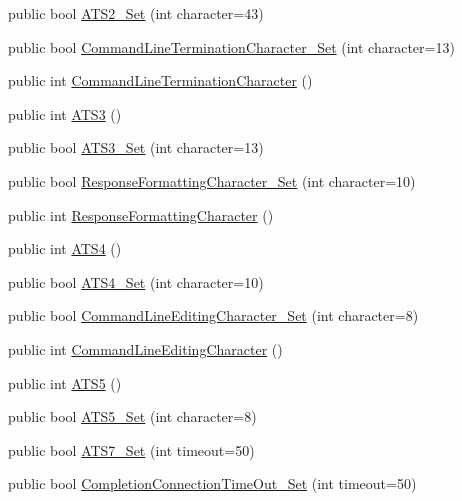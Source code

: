 \begin{DoxyCompactItemize}
\item 
public bool \hyperlink{classedwinspire_1_1_ports_1_1_modem_a91595208ec68ba0bf84aa3b2ddbff8ae}{A\-T\-S2\-\_\-\-Set} (int character=43)
\item 
public bool \hyperlink{classedwinspire_1_1_ports_1_1_modem_a77c1f7f2f59109965fa1a68dea716d92}{Command\-Line\-Termination\-Character\-\_\-\-Set} (int character=13)
\item 
public int \hyperlink{classedwinspire_1_1_ports_1_1_modem_aebfb3752533fc9c6b6700c16d4930c84}{Command\-Line\-Termination\-Character} ()
\item 
public int \hyperlink{classedwinspire_1_1_ports_1_1_modem_a3298d056581dcf0373ffefc3206466de}{A\-T\-S3} ()
\item 
public bool \hyperlink{classedwinspire_1_1_ports_1_1_modem_ae6cdfd2101756e3ea7d29022e97e9e4c}{A\-T\-S3\-\_\-\-Set} (int character=13)
\item 
public bool \hyperlink{classedwinspire_1_1_ports_1_1_modem_a92612ec64b1ea35910823424f2d16049}{Response\-Formatting\-Character\-\_\-\-Set} (int character=10)
\item 
public int \hyperlink{classedwinspire_1_1_ports_1_1_modem_a93a7a3a4fcd6b1d94f7cb3743f95dda7}{Response\-Formatting\-Character} ()
\item 
public int \hyperlink{classedwinspire_1_1_ports_1_1_modem_ad79b09ab56a81d7dcf798c9a2626a4dc}{A\-T\-S4} ()
\item 
public bool \hyperlink{classedwinspire_1_1_ports_1_1_modem_a6d2551cca4bd08c244f8b1092260a0f8}{A\-T\-S4\-\_\-\-Set} (int character=10)
\item 
public bool \hyperlink{classedwinspire_1_1_ports_1_1_modem_adddd0ba0328f8e87fd7ecdfa648126c1}{Command\-Line\-Editing\-Character\-\_\-\-Set} (int character=8)
\item 
public int \hyperlink{classedwinspire_1_1_ports_1_1_modem_a24f6b914fb202dbe0a7c1a69b19f6c09}{Command\-Line\-Editing\-Character} ()
\item 
public int \hyperlink{classedwinspire_1_1_ports_1_1_modem_a3a66c316b9b75d0f67c9e329587a4cae}{A\-T\-S5} ()
\item 
public bool \hyperlink{classedwinspire_1_1_ports_1_1_modem_a160aec849db6d17c2b685b1641e95853}{A\-T\-S5\-\_\-\-Set} (int character=8)
\item 
public bool \hyperlink{classedwinspire_1_1_ports_1_1_modem_a7d530020b45b32365f7efc9a425adc5c}{A\-T\-S7\-\_\-\-Set} (int timeout=50)
\item 
public bool \hyperlink{classedwinspire_1_1_ports_1_1_modem_abc702e61859d7337d9e27049ec63a471}{Completion\-Connection\-Time\-Out\-\_\-\-Set} (int timeout=50)

\end{DoxyCompactItemize}

